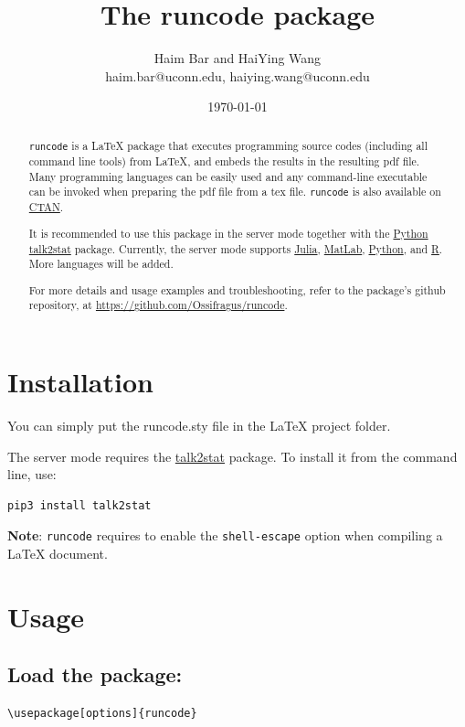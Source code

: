 \documentclass{ltxdoc}
\author{Haim Bar and HaiYing Wang \\haim.bar@uconn.edu, haiying.wang@uconn.edu}
\date{\today}
\title{The \textbf{runcode} package}
\begin{document}
\maketitle
\begin{abstract}

\texttt{runcode} is a \LaTeX{} package that executes programming source codes (including
all command line tools) from \LaTeX{}, and embeds the results in the resulting pdf
file. Many programming languages can be easily used and any command-line
executable can be invoked when preparing the pdf file from a tex file. \texttt{runcode}
is also available on \href{https://ctan.org/pkg/runcode}{CTAN}.

It is recommended to use this package in the server mode together with the
\href{https://www.python.org/}{Python} \href{https://pypi.org/project/talk2stat/}{talk2stat} package. Currently, the server mode supports \href{https://julialang.org/}{Julia}, \href{https://www.mathworks.com/products/matlab.html}{MatLab},
\href{https://www.python.org/}{Python}, and \href{https://www.r-project.org/}{R}. More languages will be added.

For more details and usage examples and troubleshooting, refer to the
package’s github repository, at \url{https://github.com/Ossifragus/runcode}.

\end{abstract}

\section{Installation}
\label{sec:org7e4c2ed}
You can simply put the runcode.sty file in the \LaTeX{} project folder.

The server mode requires the
\href{https://pypi.org/project/talk2stat/}{talk2stat} package. To install
it from the command line, use:

\begin{verbatim}
pip3 install talk2stat
\end{verbatim}

\textbf{Note}: \texttt{runcode} requires to enable the \texttt{shell-escape} option when
compiling a \LaTeX{} document.


\section{Usage}
\label{sec:org2d22735}
\subsection{Load the package:}
\label{sec:orgbfab84d}
\begin{verbatim}
\usepackage[options]{runcode}
\end{verbatim}
\end{document}
